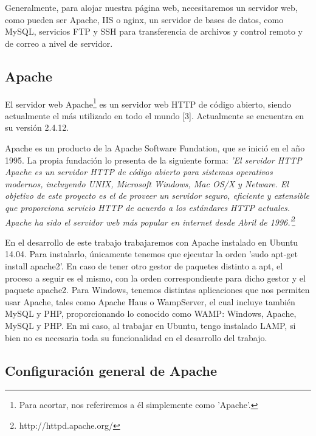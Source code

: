 \documentclass[a4paper, 10pt]{article} %
\begin{document}
Generalmente, para alojar nuestra página web, necesitaremos un servidor web, como pueden ser Apache, IIS o nginx, un servidor de bases de datos, como MySQL, servicios FTP y SSH para transferencia de archivos y control remoto y de correo a nivel de servidor. 

\subsection{Apache}

El servidor web Apache\footnote{Para acortar, nos referiremos a él simplemente como 'Apache'.} es un servidor web HTTP de código abierto, siendo actualmente el más utilizado en todo el mundo [3]. Actualmente se encuentra en su versión 2.4.12. 

Apache es un producto de la Apache Software Fundation, que se inició en el año 1995. La propia fundación lo presenta de la siguiente forma: \textit{'El servidor HTTP Apache es un servidor HTTP de código abierto para sistemas operativos modernos, incluyendo UNIX, Microsoft Windows, Mac OS/X y Netware. El objetivo de este proyecto es el de proveer un servidor seguro, eficiente y extensible que proporciona servicio HTTP de acuerdo a los estándares HTTP actuales. Apache ha sido el servidor web más popular en internet desde Abril de 1996.'}\footnote{http://httpd.apache.org/}

En el desarrollo de este trabajo trabajaremos con Apache instalado en Ubuntu 14.04. Para instalarlo, únicamente tenemos que ejecutar la orden 'sudo apt-get install apache2'. En caso de tener otro gestor de paquetes distinto a apt, el proceso a seguir es el mismo, con la orden correspondiente para dicho gestor y el paquete apache2. Para Windows, tenemos distintas aplicaciones que nos permiten usar Apache, tales como Apache Haus o WampServer, el cual incluye también MySQL y PHP, proporcionando lo conocido como WAMP: Windows, Apache, MySQL y PHP. En mi caso, al trabajar en Ubuntu, tengo instalado LAMP, si bien no es necesaria toda su funcionalidad en el desarrollo del trabajo. 


\subsection{Configuración general de Apache}

\end{document}
